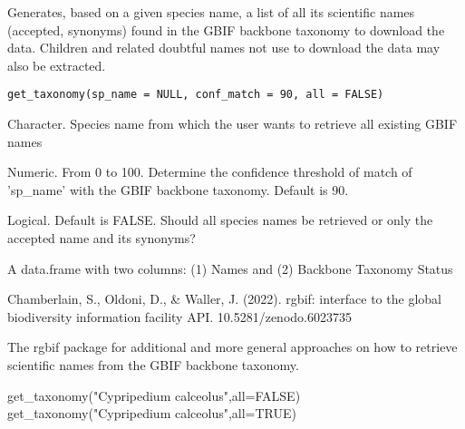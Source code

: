 \documentclass[a4paper]{book}
\begin{document}
%
\begin{Description}\relax
Generates, based on a given species name, a list of all its scientific names
(accepted, synonyms) found in the GBIF backbone taxonomy to download the data.
Children and related doubtful names not use to download the data may also be extracted.
\end{Description}
%
\begin{Usage}
\begin{verbatim}
get_taxonomy(sp_name = NULL, conf_match = 90, all = FALSE)
\end{verbatim}
\end{Usage}
%
\begin{Arguments}
\begin{ldescription}
\item[\code{sp\_name}] Character. Species name from which the user wants to retrieve all existing GBIF names

\item[\code{conf\_match}] Numeric. From 0 to 100. Determine the confidence
threshold of match of 'sp\_name' with the GBIF backbone taxonomy. Default is 90.

\item[\code{all}] Logical. Default is FALSE. Should all species names be retrieved or only
the accepted name and its synonyms?
\end{ldescription}
\end{Arguments}
%
\begin{Value}
A data.frame with two columns: (1) Names and (2) Backbone Taxonomy Status
\end{Value}
%
\begin{References}\relax
Chamberlain, S., Oldoni, D., \& Waller, J. (2022). rgbif: interface to the global biodiversity
information facility API. 10.5281/zenodo.6023735
\end{References}
%
\begin{SeeAlso}\relax
The rgbif package for additional and more general approaches on how to retrieve
scientific names from the GBIF backbone taxonomy.
\end{SeeAlso}
%
\begin{Examples}
\begin{ExampleCode}
get_taxonomy("Cypripedium calceolus",all=FALSE)
get_taxonomy("Cypripedium calceolus",all=TRUE)

\end{ExampleCode}
\end{Examples}
\end{document}
